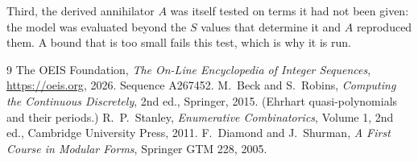 \documentclass[11pt,a4paper]{article}
\theoremstyle{plain}
\theoremstyle{definition}
\begin{document}
Third, the derived annihilator $A$ was itself tested on terms it had not been given: the model
was evaluated beyond the $S$ values that determine it and $A$ reproduced them. A bound that is
too small fails this test, which is why it is run.

\begin{thebibliography}{9}
 The OEIS Foundation, \emph{The On-Line Encyclopedia of Integer
Sequences}, \url{https://oeis.org}, 2026. Sequence A267452.
 M.~Beck and S.~Robins, \emph{Computing the Continuous Discretely},
2nd ed., Springer, 2015. (Ehrhart quasi-polynomials and their periods.)
 R.~P.~Stanley, \emph{Enumerative Combinatorics}, Volume 1, 2nd ed.,
Cambridge University Press, 2011.
 F.~Diamond and J.~Shurman, \emph{A First Course in Modular Forms},
Springer GTM 228, 2005.
\end{thebibliography}
\end{document}
